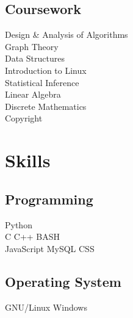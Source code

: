 \documentclass[]{deedy-resume-openfont}
\begin{document}
\begin{minipage}[t]{0.33\textwidth}


\subsection{Coursework}
Design \& Analysis of Algorithms \\
Graph Theory \\
Data Structures \\
Introduction to Linux \\
Statistical Inference \\
Linear Algebra \\
Discrete Mathematics \\
Copyright
\sectionsep


\section{Skills}
\subsection{Programming}
\textbullet{} Python \\
\textbullet{} C \textbullet{} C++ \textbullet{} BASH \\
\textbullet{} JavaScript \textbullet{} MySQL \textbullet{} CSS \\
\subsection{Operating System}
\textbullet{} GNU/Linux \textbullet{} Windows

\end{minipage}
\end{document}
